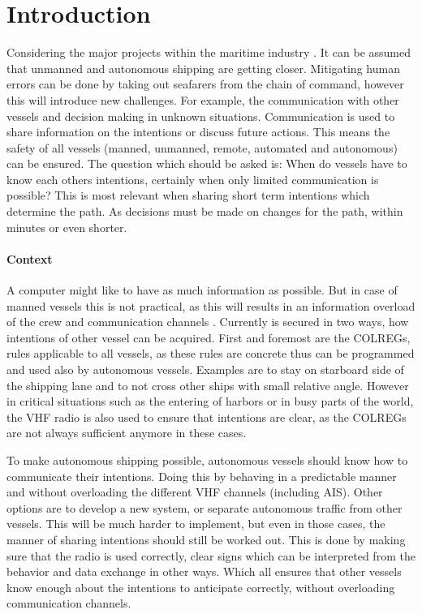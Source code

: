 \chapter*{Introduction}
\label{sec:introduction}

Considering the major projects within the maritime industry \cite{SMASH2017} \cite{Eriksen2017} \cite{MUNIN2016} \cite{Sames2017} \cite{RollsRoyce2015} \cite{Waterborne2016}. It can be assumed that unmanned and autonomous shipping are getting closer. Mitigating human errors can be done by taking out seafarers from the chain of command, however this will introduce new challenges. For example, the communication with other vessels and decision making in unknown situations. Communication is used to share information on the intentions or discuss future actions. This means the safety of all vessels (manned, unmanned, remote, automated and autonomous) can be ensured. The question which should be asked is: When do vessels have to know each others intentions, certainly when only limited communication is possible? This is most relevant when sharing short term intentions which determine the path. As decisions must be made on changes for the path, within minutes or even shorter.

\subsubsection*{Context}
A computer might like to have as much information as possible. But in case of manned vessels this is not practical, as this will results in an information overload of the crew and communication channels \cite{CCNR2017}. Currently is secured in two ways, how intentions of other vessel can be acquired. First and foremost are the \ac{COLREGs}\cite{IMO1972}, rules applicable to all vessels, as these rules are concrete thus can be programmed and used also by autonomous vessels. Examples are to stay on starboard side of the shipping lane and to not cross other ships with small relative angle. However in critical situations such as the entering of harbors or in busy parts of the world, the VHF radio is also used to ensure that intentions are clear, as the \ac{COLREGs} are not always sufficient anymore in these cases.

To make autonomous shipping possible, autonomous vessels should know how to communicate their intentions. Doing this by behaving in a predictable manner and without overloading the different VHF channels (including AIS). Other options are to develop a new system, or separate autonomous traffic from other vessels. This will be much harder to implement, but even in those cases, the manner of sharing intentions should still be worked out. This is done by making sure that the radio is used correctly, clear signs which can be interpreted from the behavior and data exchange in other ways. Which all ensures that other vessels know enough about the intentions to anticipate correctly, without overloading communication channels.

